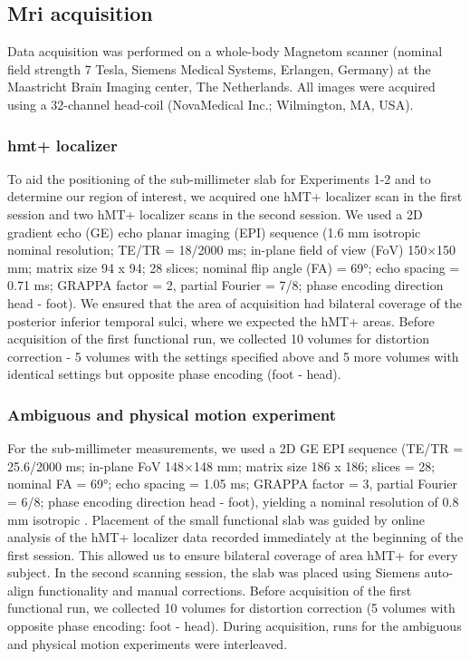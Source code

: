 \subsection{Mri acquisition}
Data acquisition was performed on a whole-body Magnetom scanner (nominal field strength 7 Tesla, Siemens Medical Systems, Erlangen, Germany) at the Maastricht Brain Imaging center, The Netherlands. All images were acquired using a 32-channel head-coil (NovaMedical Inc.; Wilmington, MA, USA).

\subsubsection{hmt+ localizer}
To aid the positioning of the sub-millimeter slab for Experiments 1-2 and to determine our region of interest, we acquired one hMT+ localizer scan in the first session and two hMT+ localizer scans in the second session. We used a 2D gradient echo (GE) echo planar imaging (EPI) sequence (1.6 mm isotropic nominal resolution; TE/TR = 18/2000 ms; in-plane field of view (FoV) 150×150 mm; matrix size 94 x 94; 28 slices; nominal flip angle (FA) = 69°; echo spacing = 0.71 ms; GRAPPA factor = 2, partial Fourier = 7/8; phase encoding direction head - foot). We ensured that the area of acquisition had bilateral coverage of the posterior inferior temporal sulci, where we expected the hMT+ areas. Before acquisition of the first functional run, we collected 10 volumes for distortion correction - 5 volumes with the settings specified above and 5 more volumes with identical settings but opposite phase encoding (foot - head).

\subsubsection{Ambiguous and physical motion experiment}
For the sub-millimeter measurements, we used a 2D GE EPI sequence (TE/TR = 25.6/2000 ms; in-plane FoV 148×148 mm; matrix size 186 x 186; slices = 28; nominal FA = 69°; echo spacing = 1.05 ms; GRAPPA factor = 3, partial Fourier = 6/8; phase encoding direction head - foot), yielding a nominal resolution of 0.8 mm isotropic \parencite{Moeller2010, Setsompop2012}. Placement of the small functional slab was guided by online analysis of the hMT+ localizer data recorded immediately at the beginning of the first session. This allowed us to ensure bilateral coverage of area hMT+ for every subject. In the second scanning session, the slab was placed using Siemens auto-align functionality and manual corrections. Before acquisition of the first functional run, we collected 10 volumes for distortion correction (5 volumes with opposite phase encoding: foot - head). During acquisition, runs for the ambiguous and physical motion experiments were interleaved.


